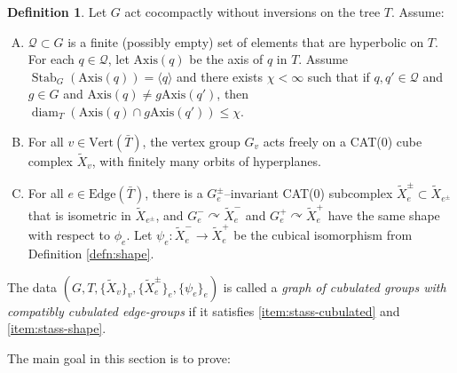 \documentclass[11pt,oneside]{amsart}
\newcounter{ax}
\theoremstyle{definition}
\newtheorem{defn}[thm]{Definition}
\DeclareMathOperator{\stabilizer}{Stab}
\DeclareMathOperator{\diam}{diam}
\newcommand{\vertices}{\mathrm{Vert}}
\newcommand{\edges}{\mathrm{Edge}}
\newcommand{\axis}{\mathrm{Axis}}
\begin{document}
\begin{defn}\label{defn:graph-walls}
Let $G$ act cocompactly without inversions on the tree $T$. Assume:
\begin{enumerate}[(A)]
 \item $\mathcal Q\subset G$ is a finite (possibly empty) set of elements that are hyperbolic on $T$.  For each $q\in \mathcal Q$, let $\axis(q)$ be the axis of $q$ in $T$.  Assume $\stabilizer_G(\axis(q))=\langle q\rangle$ and there exists $\chi<\infty$ such that if $q,q'\in\mathcal Q$ and $g\in G$ and $\axis(q)\neq g\axis(q')$, then $\diam_T(\axis(q)\cap g\axis(q'))\leq \chi$.\label{item:stass-Q}
  
 \item For all $v\in\vertices(\bar T)$, the vertex group $G_v$ acts freely on a CAT(0) cube complex $\widetilde X_v$, with finitely many orbits of hyperplanes.\label{item:stass-cubulated}
 
 \item \label{item:stass-shape} For all $e\in\edges(\bar T)$, there is a $G_e^\pm$--invariant CAT(0) subcomplex $\widetilde X_e^\pm\subset \widetilde X_{e^\pm}$ that is isometric in $\widetilde X_{e^\pm}$, and $G_e^-\curvearrowright \widetilde X_e^-$ and $G_e^+\curvearrowright \widetilde X_e^+$ have the same shape with respect to $\phi_e$.  Let $\psi_e:\widetilde X_e^-\to\widetilde X_e^+$ be the cubical isomorphism from Definition \ref{defn:shape}.
\end{enumerate}
The data $(G,T,\{\widetilde X_v\}_v,\{\widetilde X_e^{\pm}\}_e,\{\psi_e\}_e)$ is called a \emph{graph of cubulated groups with compatibly cubulated edge-groups} if it satisfies \eqref{item:stass-cubulated} and \eqref{item:stass-shape}.  
\end{defn}

The main goal in this section is to prove:
\end{document}
